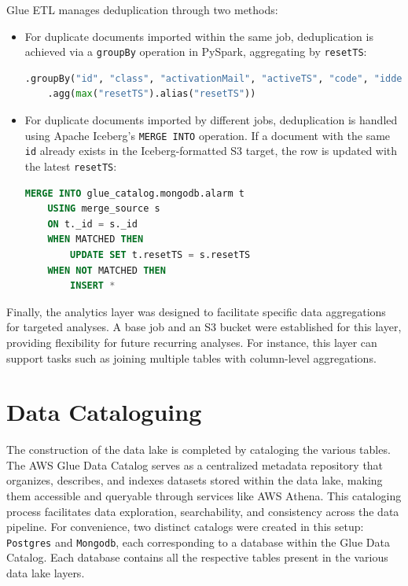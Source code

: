 Glue \ac{ETL} manages deduplication through two methods:
\begin{itemize}
    \item For duplicate documents imported within the same job, deduplication is achieved via a \texttt{groupBy} operation in PySpark, aggregating by \texttt{resetTS}:
    \begin{lstlisting}[language=python]
    .groupBy("id", "class", "activationMail", "activeTS", "code", "iddevice", "resetMail", "payload")
    .agg(max("resetTS").alias("resetTS"))
    \end{lstlisting}
    
    \item For duplicate documents imported by different jobs, deduplication is handled using Apache Iceberg's \texttt{MERGE INTO} operation. If a document with the same \texttt{id} already exists in the Iceberg-formatted \ac{S3} target, the row is updated with the latest \texttt{resetTS}:
    \begin{lstlisting}[language=sql]
    MERGE INTO glue_catalog.mongodb.alarm t
    USING merge_source s
    ON t._id = s._id
    WHEN MATCHED THEN
        UPDATE SET t.resetTS = s.resetTS
    WHEN NOT MATCHED THEN
        INSERT *
    \end{lstlisting}
\end{itemize}

Finally, the analytics layer was designed to facilitate specific data aggregations for targeted analyses. A base job and an \ac{S3} bucket were established for this layer, providing flexibility for future recurring analyses. For instance, this layer can support tasks such as joining multiple tables with column-level aggregations.

\section{Data Cataloguing}
The construction of the data lake is completed by cataloging the various tables. The \ac{AWS} Glue Data Catalog serves as a centralized metadata repository that organizes, describes, and indexes datasets stored within the data lake, making them accessible and queryable through services like \ac{AWS} Athena. This cataloging process facilitates data exploration, searchability, and consistency across the data pipeline. For convenience, two distinct catalogs were created in this setup: \texttt{Postgres} and \texttt{Mongodb}, each corresponding to a database within the Glue Data Catalog. Each database contains all the respective tables present in the various data lake layers.

